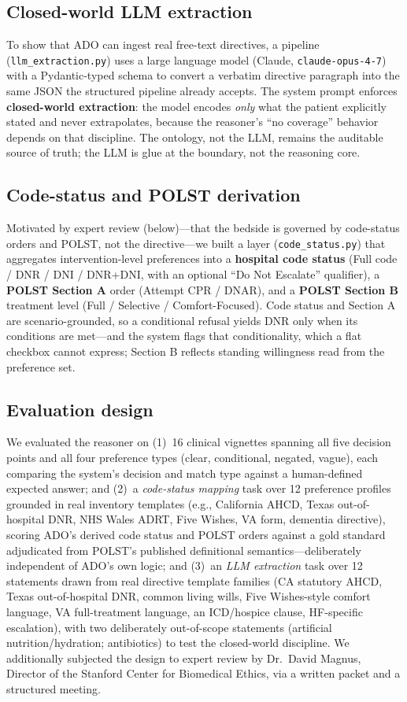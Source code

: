 \documentclass[10pt]{article}
\begin{document}
\subsection{Closed-world LLM extraction}
To show that ADO can ingest real free-text directives, a pipeline (\texttt{llm\_extraction.py}) uses a large language model (Claude, \texttt{claude-opus-4-7}) with a Pydantic-typed schema to convert a verbatim directive paragraph into the same JSON the structured pipeline already accepts. The system prompt enforces \textbf{closed-world extraction}: the model encodes \emph{only} what the patient explicitly stated and never extrapolates, because the reasoner's ``no coverage'' behavior depends on that discipline. The ontology, not the LLM, remains the auditable source of truth; the LLM is glue at the boundary, not the reasoning core.

\subsection{Code-status and POLST derivation}
Motivated by expert review (below)---that the bedside is governed by code-status orders and POLST, not the directive---we built a layer (\texttt{code\_status.py}) that aggregates intervention-level preferences into a \textbf{hospital code status} (Full code / DNR / DNI / DNR+DNI, with an optional ``Do Not Escalate'' qualifier), a \textbf{POLST Section A} order (Attempt CPR / DNAR), and a \textbf{POLST Section B} treatment level (Full / Selective / Comfort-Focused). Code status and Section A are scenario-grounded, so a conditional refusal yields DNR only when its conditions are met---and the system flags that conditionality, which a flat checkbox cannot express; Section B reflects standing willingness read from the preference set.

\subsection{Evaluation design}
We evaluated the reasoner on (1)~16 clinical vignettes spanning all five decision points and all four preference types (clear, conditional, negated, vague), each comparing the system's decision and match type against a human-defined expected answer; and (2)~a \emph{code-status mapping} task over 12 preference profiles grounded in real inventory templates (e.g., California AHCD, Texas out-of-hospital DNR, NHS Wales ADRT, Five Wishes, VA form, dementia directive), scoring ADO's derived code status and POLST orders against a gold standard adjudicated from POLST's published definitional semantics---deliberately independent of ADO's own logic; and (3)~an \emph{LLM extraction} task over 12 statements drawn from real directive template families (CA statutory AHCD, Texas out-of-hospital DNR, common living wills, Five Wishes-style comfort language, VA full-treatment language, an ICD/hospice clause, HF-specific escalation), with two deliberately out-of-scope statements (artificial nutrition/hydration; antibiotics) to test the closed-world discipline. We additionally subjected the design to expert review by Dr.\ David Magnus, Director of the Stanford Center for Biomedical Ethics, via a written packet and a structured meeting.
\end{document}
